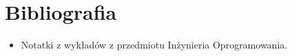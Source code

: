 \documentclass[a4paper, 11pt]{article}
\begin{document}
	\section{Bibliografia}
	\begin{itemize}
	\item Notatki z wykładów z przedmiotu Inżynieria Oprogramowania.
	\end{itemize}
	
\end{document}
